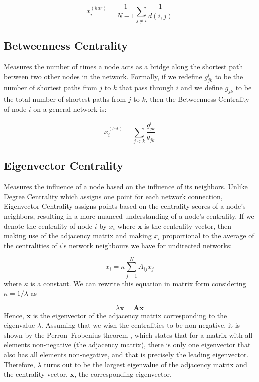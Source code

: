 \begin{equation}
    x_i^{(har)}= \frac{1}{N-1}\sum_{j\ne i}^{}\frac{1}{d(i,j)}
\end{equation}

\subsection*{Betweenness Centrality} Measures the number of times a node acts as a bridge along the shortest path between two other nodes in the network. Formally, if we redefine $g_{jk}^i$ to be the number of shortest paths from $j$ to $k$ that pass through $i$ and we define $g_{jk}$ to be the total number of shortest paths from $j$ to $k$, then the Betweenness Centrality of node $i$ on a general network is:

\begin{equation}
    x_i^{(bet)}= \sum_{j<k}^{}\frac{g_{jk}^i}{g_{jk}}
\end{equation}

\subsection*{Eigenvector Centrality} Measures the influence of a node based on the influence of its neighbors. Unlike Degree Centrality which assigns one point for each network connection, Eigenvector Centrality assigns points based on the centrality scores of a node's neighbors, resulting in a more nuanced understanding of a node's centrality. If we denote the centrality of node $i$ by $x_i$ where $\mathbf{x}$ is the centrality vector, then making use of the adjacency matrix and making $x_i$ proportional to the average of the centralities of $i$’s network neighbours we have for undirected networks:

\begin{equation}
\label{eqn:eigc}
    x_i= \kappa\sum_{j=1}^{N}A_{ij}x_j
\end{equation}
where $\kappa$ is a constant. We can rewrite this equation in matrix form considering $\kappa=1/\lambda$ as

\begin{equation}
    \lambda \mathbf{x} = \mathbf{A}\mathbf{x}
\end{equation}
Hence, $\mathbf{x}$ is the eigenvector of the adjacency matrix corresponding to the eigenvalue $\lambda$. Assuming that we wish the centralities to be non-negative, it is shown by the Perron–Frobenius theorem \cite{meyer2000matrix}, which states that for a matrix with all elements non-negative (the adjacency matrix), there is only one eigenvector that also has all elements non-negative, and that is precisely the leading eigenvector. Therefore, $\lambda$ turns out to be the largest eigenvalue of the adjacency matrix and the centrality vector, $\mathbf{x}$, the corresponding eigenvector. 

